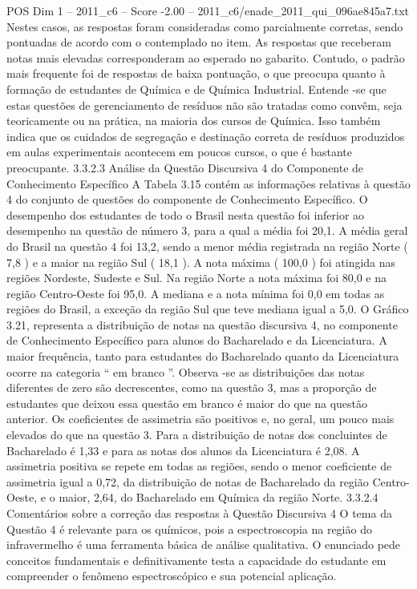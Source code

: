 \begin{textsample}{POS Dim 1 – 2011\_c6 – Score -2.00 – 2011\_c6/enade\_2011\_qui\_096ae845a7.txt}
Nestes casos, as respostas foram consideradas como parcialmente corretas, sendo pontuadas de acordo com o contemplado no item.
As respostas que receberam notas mais elevadas corresponderam ao esperado no gabarito.
Contudo, o padrão mais frequente foi de respostas de baixa pontuação, o que preocupa quanto à formação de estudantes de Química e de Química Industrial.
Entende -se que estas questões de gerenciamento de resíduos não são tratadas como convêm, seja teoricamente ou na prática, na maioria dos cursos de Química.
Isso também indica que os cuidados de segregação e destinação correta de resíduos produzidos em aulas experimentais acontecem em poucos cursos, o que é bastante preocupante. 3.3.2.3 Análise da Questão Discursiva 4 do Componente de Conhecimento Específico A Tabela 3.15 contém as informações relativas à questão 4 do conjunto de questões do componente de Conhecimento Específico.
O desempenho dos estudantes de todo o Brasil nesta questão foi inferior ao desempenho na questão de número 3, para a qual a média foi 20,1.
A média geral do Brasil na questão 4 foi 13,2, sendo a menor média registrada na região Norte ( 7,8 ) e a maior na região Sul ( 18,1 ).
A nota máxima ( 100,0 ) foi atingida nas regiões Nordeste, Sudeste e Sul.
Na região Norte a nota máxima foi 80,0 e na região Centro-Oeste foi 95,0.
A mediana e a nota mínima foi 0,0 em todas as regiões do Brasil, a exceção da região Sul que teve mediana igual a 5,0.
O Gráfico 3.21, representa a distribuição de notas na questão discursiva 4, no componente de Conhecimento Específico para alunos do Bacharelado e da Licenciatura.
A maior frequência, tanto para estudantes do Bacharelado quanto da Licenciatura ocorre na categoria “ em branco ”.
Observa -se as distribuições das notas diferentes de zero são decrescentes, como na questão 3, mas a proporção de estudantes que deixou essa questão em branco é maior do que na questão anterior.
Os coeficientes de assimetria são positivos e, no geral, um pouco mais elevados do que na questão 3.
Para a distribuição de notas dos concluintes de Bacharelado é 1,33 e para as notas dos alunos da Licenciatura é 2,08.
A assimetria positiva se repete em todas as regiões, sendo o menor coeficiente de assimetria igual a 0,72, da distribuição de notas de Bacharelado da região Centro-Oeste, e o maior, 2,64, do Bacharelado em Química da região Norte. 3.3.2.4 Comentários sobre a correção das respostas à Questão Discursiva 4 O tema da Questão 4 é relevante para os químicos, pois a espectroscopia na região do infravermelho é uma ferramenta básica de análise qualitativa.
O enunciado pede conceitos fundamentais e definitivamente testa a capacidade do estudante em compreender o fenômeno espectroscópico e sua potencial aplicação.

\end{textsample}
